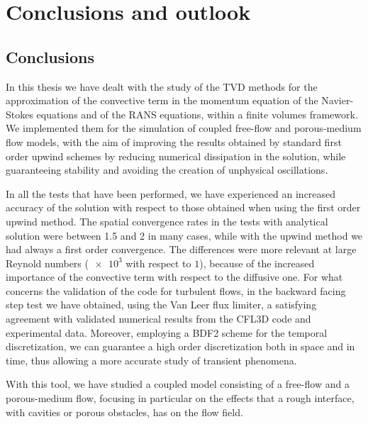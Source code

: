 \chapter{Conclusions and outlook}
\section{Conclusions}
In this thesis we have dealt with the study of the TVD methods for the 
approximation of the convective term in the momentum equation of the 
Navier-Stokes equations and of the RANS equations, within a finite volumes 
framework. We implemented them for the simulation of coupled free-flow and 
porous-medium flow models, with the aim of improving the results obtained by
standard first order upwind schemes by reducing numerical dissipation 
in the solution, while guaranteeing stability 
and avoiding the creation of unphysical oscillations.

In all the tests that have been performed, we have experienced an increased 
accuracy of the solution with respect to those obtained when using the first order 
upwind method. The spatial convergence rates in the tests with analytical 
solution were between 1.5 and 2 in many cases, while with the upwind method we had always a first order convergence. 
The differences were more relevant at large Reynold numbers ($\num{e3}$ with respect to $1$), because of the increased importance of the convective term with respect to the diffusive one.
For what concerns the validation of the code for turbulent flows, in the backward facing 
step test we have 
obtained, using the Van Leer flux limiter, a satisfying agreement with 
validated numerical results from the CFL3D code and experimental data.
Moreover, employing a BDF2 scheme for the 
temporal discretization, we can guarantee a high order discretization both 
in space and in time, thus allowing a more accurate study of transient 
phenomena.

With this tool, we have studied a coupled model consisting of a free-flow and a 
porous-medium flow, focusing in particular on the effects that a rough
interface, with cavities or porous obstacles, has on the flow field.

